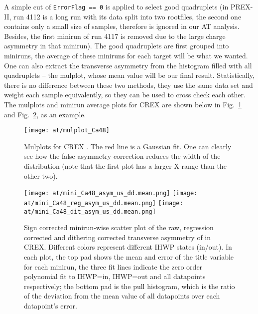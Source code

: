 A simple cut of \verb|ErrorFlag == 0| is applied to select good quadruplets 
(in PREX-II, run 4112 is a long run with its data split into two rootfiles, the
second one contains only a small size of samples, therefore is ignored in our AT analysis.
Besides, the first minirun of run 4117 is removed due to the large charge asymmetry
in that minirun). The good quadruplets are first grouped into miniruns, 
the average of these miniruns for each target will be what we wanted. 
One can also extract the transverse asymmetry from the histogram filled with
all quadruplets -- the mulplot, whose mean value will be our final result. 
Statistically, there is no difference between these two methods,
they use the same data set and weight each sample equivalently, so they can
be used to cross check each other. The mulplots and minirun average plots for
CREX \Ca are shown below in Fig.~\ref{fig:AT_crex_Ca48_mulplot} and 
Fig.~\ref{fig:AT_crex_Ca48_miniruns}, as an example.

\begin{figure}[!h]
    \centering
    \texttt{[image: at/mulplot\_Ca48]}
    \caption{Mulplots for CREX \Ca. The red line is a Gaussian fit. One can clearly 
    see how the false asymmetry correction reduces the width of the distribution (note that
    the first plot has a larger X-range than the other two).}
    \label{fig:AT_crex_Ca48_mulplot}
\end{figure}

\begin{figure}[H]
    \centering
    \texttt{[image: at/mini\_Ca48\_asym\_us\_dd.mean.png]}
    \texttt{[image: at/mini\_Ca48\_reg\_asym\_us\_dd.mean.png]}
    \texttt{[image: at/mini\_Ca48\_dit\_asym\_us\_dd.mean.png]}
    \caption{Sign corrected minirun-wise scatter plot of the raw, regression corrected and 
    dithering corrected transverse asymmetry of \Ca in CREX. Different colors represent
    different IHWP states (in/out). In each plot, the top pad shows the 
    mean and error of the title variable for each minirun, the three fit lines indicate
    the zero order polynomial fit to IHWP=in, IHWP=out and all datapoints respectively;
    the bottom pad is the pull histogram, which is the ratio of the deviation 
    from the mean value of all datapoints over each datapoint's error.
    }
    \label{fig:AT_crex_Ca48_miniruns}
\end{figure}


